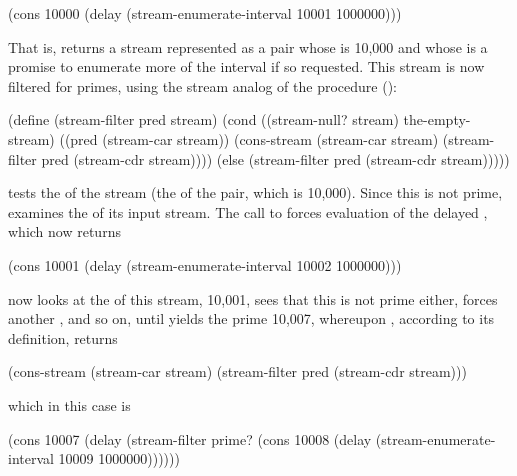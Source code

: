 \begin{codeBlock}
(cons 10000
      (delay (stream-enumerate-interval 10001 1000000)))
\end{codeBlock}

\noindent
That is,  returns a stream represented as a
pair whose  is 10,000 and whose  is a promise to enumerate
more of the interval if so requested.  This stream is now filtered for primes,
using the stream analog of the  procedure ():

\begin{codeBlock}
(define (stream-filter pred stream)
  (cond ((stream-null? stream) the-empty-stream)
        ((pred (stream-car stream))
         (cons-stream (stream-car stream)
                      (stream-filter
                       pred
                       (stream-cdr stream))))
        (else (stream-filter pred (stream-cdr stream)))))
\end{codeBlock}

\noindent
{} tests the  of the stream (the 
of the pair, which is 10,000).  Since this is not prime, 
examines the  of its input stream.  The call to
 forces evaluation of the delayed
, which now returns

\begin{codeBlock}
(cons 10001
      (delay (stream-enumerate-interval 10002 1000000)))
\end{codeBlock}

\noindent
{} now looks at the  of this stream, 10,001,
sees that this is not prime either, forces another , and so
on, until  yields the prime 10,007, whereupon
, according to its definition, returns

\begin{codeBlock}
(cons-stream (stream-car stream)
             (stream-filter pred (stream-cdr stream)))
\end{codeBlock}

\noindent
which in this case is

\begin{codeBlock}
(cons 10007
      (delay (stream-filter
              prime?
              (cons 10008
                    (delay (stream-enumerate-interval
                            10009
                            1000000))))))
\end{codeBlock}

